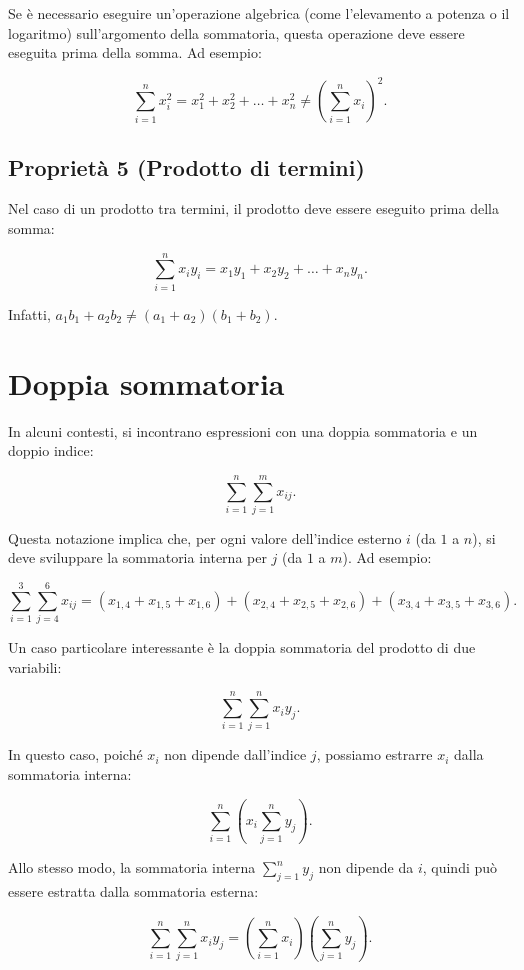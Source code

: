 \documentclass[
  italian,
  letterpaper,
  a4paper,
  11pt,
  open=any]{scrbook}
\theoremstyle{plain}
\theoremstyle{definition}
\theoremstyle{definition}
\theoremstyle{remark}
\begin{document}
Se è necessario eseguire un'operazione algebrica (come l'elevamento a
potenza o il logaritmo) sull'argomento della sommatoria, questa
operazione deve essere eseguita prima della somma. Ad esempio:

\[
\sum_{i=1}^{n} x_i^2 = x_1^2 + x_2^2 + \dots + x_n^2 \neq \left( \sum_{i=1}^{n} x_i \right)^2.
\]

\subsection{Proprietà 5 (Prodotto di
termini)}\label{proprietuxe0-5-prodotto-di-termini}

Nel caso di un prodotto tra termini, il prodotto deve essere eseguito
prima della somma:

\[
\sum_{i=1}^{n} x_i y_i = x_1 y_1 + x_2 y_2 + \dots + x_n y_n.
\]

Infatti, \(a_1 b_1 + a_2 b_2 \neq (a_1 + a_2)(b_1 + b_2)\).

\section{Doppia sommatoria}\label{doppia-sommatoria}

In alcuni contesti, si incontrano espressioni con una doppia sommatoria
e un doppio indice:

\[
\sum_{i=1}^{n} \sum_{j=1}^{m} x_{ij}.
\]

Questa notazione implica che, per ogni valore dell'indice esterno \(i\)
(da \(1\) a \(n\)), si deve sviluppare la sommatoria interna per \(j\)
(da \(1\) a \(m\)). Ad esempio:

\[
\sum_{i=1}^{3} \sum_{j=4}^{6} x_{ij} = (x_{1,4} + x_{1,5} + x_{1,6}) + (x_{2,4} + x_{2,5} + x_{2,6}) + (x_{3,4} + x_{3,5} + x_{3,6}).
\]

Un caso particolare interessante è la doppia sommatoria del prodotto di
due variabili:

\[
\sum_{i=1}^{n} \sum_{j=1}^{n} x_i y_j.
\]

In questo caso, poiché \(x_i\) non dipende dall'indice \(j\), possiamo
estrarre \(x_i\) dalla sommatoria interna:

\[
\sum_{i=1}^{n} \left( x_i \sum_{j=1}^{n} y_j \right).
\]

Allo stesso modo, la sommatoria interna \(\sum_{j=1}^{n} y_j\) non
dipende da \(i\), quindi può essere estratta dalla sommatoria esterna:

\[
\sum_{i=1}^{n} \sum_{j=1}^{n} x_i y_j = \left( \sum_{i=1}^{n} x_i \right) \left( \sum_{j=1}^{n} y_j \right).
\]
\end{document}
